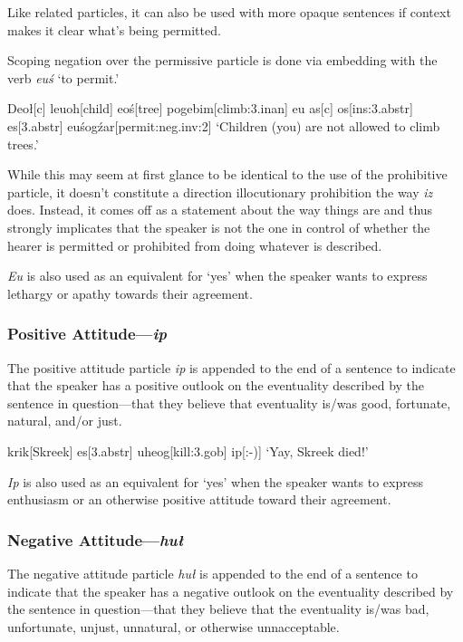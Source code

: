 \documentclass[a4paper,11pt,oneside,openany]{memoir}
\begin{document}
Like related particles, it can also be used with more opaque sentences if context makes it clear what's being permitted. 

Scoping negation over the permissive particle is done via embedding with the verb \textit{eu\dbl\'s} `to permit.'

\ex 
\begingl
Deo\l[\sc c]
\vz leuoh[child]
\vd eo\'s[tree]
pogebim[climb:{\sc 3.inan}]
eu\vs[\sc perm]
\nogloss{,}
as[\sc c]
\vc os[\sc ins:3.abstr]
es[\sc 3.abstr]
eu\dbl\'sog\'zar[permit:{\sc neg.inv:2}]
\glft `Children (you) are not allowed to climb trees.'
\endgl
\xe

While this may seem at first glance to be identical to the use of the prohibitive particle, it doesn't constitute a direction illocutionary prohibition the way \textit{iz} does. Instead, it comes off as a statement about the way things are and thus strongly implicates that the speaker is not the one in control of whether the hearer is permitted or prohibited from doing whatever is described.

\textit{Eu\vs} is also used as an equivalent for `yes' when the speaker wants to express lethargy or apathy towards their agreement.

\subsubsection{Positive Attitude---\textit{ip}}

The positive attitude particle \textit{ip} is appended to the end of a sentence to indicate that the speaker has a positive outlook on the eventuality described by the sentence in question---that they believe that eventuality is/was good, fortunate, natural, and/or just.

\ex
\begingl
\vS krik[Skreek]
es[\sc 3.abstr]
uheog[kill:{\sc 3.gob}]
ip[:-{)}]
\glft `Yay, Skreek died!'
\endgl
\xe

\textit{Ip} is also used as an equivalent for `yes' when the speaker wants to express enthusiasm or an otherwise positive attitude toward their agreement.

\subsubsection{Negative Attitude---\textit{hu\l}}

The negative attitude particle \textit{hu\l} is appended to the end of a sentence to indicate that the speaker has a negative outlook on the eventuality described by the sentence in question---that they believe that the eventuality is/was bad, unfortunate, unjust, unnatural, or otherwise unnacceptable.
\end{document}
